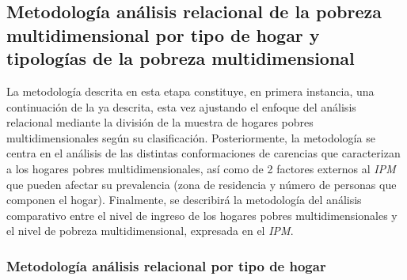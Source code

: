 \documentclass[12pt,letterpaper,spanish]{article}
\begin{document}
\subsection{Metodología análisis relacional de la pobreza multidimensional por tipo de hogar y tipologías de la pobreza multidimensional}

La metodología descrita en esta etapa constituye, en primera instancia, una continuación de la ya descrita, esta vez ajustando el enfoque del análisis relacional mediante la división de la muestra de hogares pobres multidimensionales según su clasificación. Posteriormente, la metodología se centra en el análisis de las distintas conformaciones de carencias que caracterizan a los hogares pobres multidimensionales, así como de 2 factores externos al \textit{IPM} que pueden afectar su prevalencia (zona de residencia y número de personas que componen el hogar). Finalmente, se describirá la metodología del análisis comparativo entre el nivel de ingreso de los hogares pobres multidimensionales  y el nivel de pobreza multidimensional, expresada en el \textit{IPM}. 



\subsubsection{Metodología análisis relacional por tipo de hogar}
    
\end{document}
